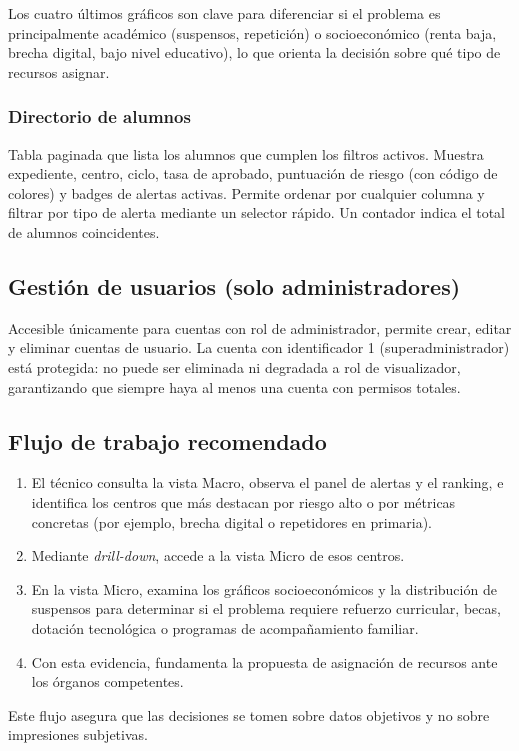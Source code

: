 Los cuatro últimos gráficos son clave para diferenciar si el problema es principalmente académico (suspensos, repetición) o socioeconómico (renta baja, brecha digital, bajo nivel educativo), lo que orienta la decisión sobre qué tipo de recursos asignar.

\subsubsection{Directorio de alumnos}

Tabla paginada que lista los alumnos que cumplen los filtros activos. Muestra expediente, centro, ciclo, tasa de aprobado, puntuación de riesgo (con código de colores) y badges de alertas activas. Permite ordenar por cualquier columna y filtrar por tipo de alerta mediante un selector rápido. Un contador indica el total de alumnos coincidentes.

\subsection{Gestión de usuarios (solo administradores)}

Accesible únicamente para cuentas con rol de administrador, permite crear, editar y eliminar cuentas de usuario. La cuenta con identificador 1 (superadministrador) está protegida: no puede ser eliminada ni degradada a rol de visualizador, garantizando que siempre haya al menos una cuenta con permisos totales.

\subsection{Flujo de trabajo recomendado}

\begin{enumerate}
    \item El técnico consulta la vista Macro, observa el panel de alertas y el ranking, e identifica los centros que más destacan por riesgo alto o por métricas concretas (por ejemplo, brecha digital o repetidores en primaria).
    \item Mediante \textit{drill-down}, accede a la vista Micro de esos centros.
    \item En la vista Micro, examina los gráficos socioeconómicos y la distribución de suspensos para determinar si el problema requiere refuerzo curricular, becas, dotación tecnológica o programas de acompañamiento familiar.
    \item Con esta evidencia, fundamenta la propuesta de asignación de recursos ante los órganos competentes.
\end{enumerate}

Este flujo asegura que las decisiones se tomen sobre datos objetivos y no sobre impresiones subjetivas.